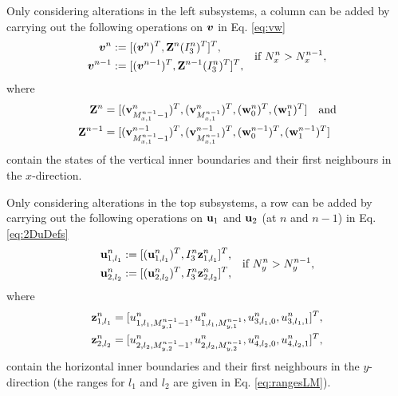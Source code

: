 \documentclass[fleqn]{jaes}
\begin{document}
Only considering alterations in the left subsystems, a column can be added by carrying out the following operations on $\boldsymbol{v}$ in Eq. \eqref{eq:vw}
\begin{equation}
\begin{aligned}
   \vv^n &:= [(\vv^n)^T, \Z^n(I_3^n)^T]^T,\\
   \vv^{n-1} &:= [(\vv^{n-1})^T, \Z^{n-1}(I_3^n)^T]^T,
   \end{aligned} \quad \text{if } N_x^n > N_x^{n-1},
\end{equation}
where
\begin{align*}
\Z^n &= [(\v_{M_{x,1}^{n-1}-1}^n)^T, (\v_{M_{x,1}^{n-1}}^n)^T, (\w_{0}^n)^T, (\w_{1}^n)^T] \quad \text{and}\\
\Z^{n-1} &= [(\v_{M_{x,1}^{n-1}-1}^{n-1})^T, (\v_{M_{x,1}^{n-1}}^{n-1})^T, (\w_{0}^{n-1})^T, (\w_{1}^{n-1})^T]
\end{align*}
contain the states of the vertical inner boundaries and their first neighbours in the $x$-direction. 

Only considering alterations in the top subsystems, a row can be added by carrying out the following operations on $\mathbf{u}_1$ and $\mathbf{u}_2$ (at $n$ and $n-1$) in Eq. \eqref{eq:2DuDefs} 
\begin{equation*}
    \begin{aligned}
        \u_{1,l_1}^n &:= [(\u_{1,l_1}^n)^T, I_3^n \z_{1, l_1}^n]^T,\\
        \u_{2,l_2}^n &:= [(\u_{2,l_2}^n)^T, I_3^n \z_{2, l_2}^n]^T,
    \end{aligned}\quad \text{if } N_y^n > N_y^{n-1},
\end{equation*}
where 
\begin{align*}
    \mathbf{z}_{1,l_1}^n &= [u_{1, l_1, M_{y,1}^{n-1}-1}^n, u_{1, l_1, M_{y,1}^{n-1}}^n, u_{3, l_1, 0}^n, u_{3, l_1, 1}^n]^T,\\
    \mathbf{z}_{2,l_2}^n &= [u_{2, l_2, M_{y,2}^{n-1}-1}^n, u_{2, l_2, M_{y,2}^{n-1}}^n, u_{4, l_2, 0}^n, u_{4, l_2, 1}^n]^T,
\end{align*}
contain the horizontal inner boundaries and their first neighbours in the $y$-direction (the ranges for $l_1$ and $l_2$ are given in Eq. \eqref{eq:rangesLM}).
\end{document}
